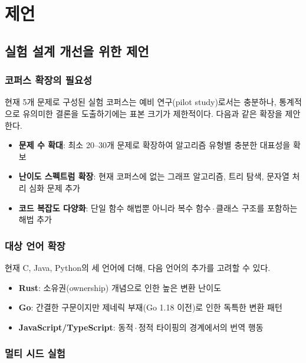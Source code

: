 \section{제언}\label{sec:recommendations}

\subsection{실험 설계 개선을 위한 제언}\label{ssec:rec-design}

\subsubsection{코퍼스 확장의 필요성}\label{sssec:corpus-expansion}

현재 5개 문제로 구성된 실험 코퍼스는 예비 연구(pilot study)로서는 충분하나,
통계적으로 유의미한 결론을 도출하기에는 표본 크기가 제한적이다.
다음과 같은 확장을 제안한다.

\begin{itemize}[leftmargin=2em]
  \item \textbf{문제 수 확대}: 최소 20--30개 문제로 확장하여 알고리즘 유형별
    충분한 대표성을 확보
  \item \textbf{난이도 스펙트럼 확장}: 현재 코퍼스에 없는 그래프 알고리즘,
    트리 탐색, 문자열 처리 심화 문제 추가
  \item \textbf{코드 복잡도 다양화}: 단일 함수 해법뿐 아니라
    복수 함수\,$\cdot$\,클래스 구조를 포함하는 해법 추가
\end{itemize}

\subsubsection{대상 언어 확장}\label{sssec:language-expansion}

현재 C, Java, Python의 세 언어에 더해, 다음 언어의 추가를 고려할 수 있다.

\begin{itemize}[leftmargin=2em]
  \item \textbf{Rust}: 소유권(ownership) 개념으로 인한 높은 변환 난이도
  \item \textbf{Go}: 간결한 구문이지만 제네릭 부재(Go 1.18 이전)로 인한
    독특한 변환 패턴
  \item \textbf{JavaScript/TypeScript}: 동적\,$\cdot$\,정적 타이핑의 경계에서의
    번역 행동
\end{itemize}

\subsubsection{멀티 시드 실험}\label{sssec:multi-seed}

